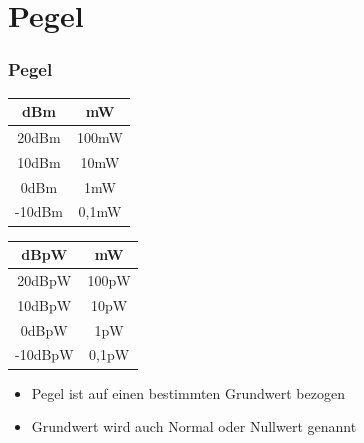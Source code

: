 \section*{Pegel}
\begin{frame}
\frametitle{Pegel}
\begin{center}
\begin{large}
\begin{minipage}{0.3\textwidth}
	\begin{tabular}{|c|c|}
		\hline
		dBm & mW \\
		\hline \hline
		20dBm  & 100mW  \\ \hline
		10dBm  & 10mW   \\ \hline
		0dBm   & 1mW    \\ \hline
		-10dBm & 0,1mW  \\ \hline
	\end{tabular}
\end{minipage}
\hspace{2cm}
\begin{minipage}{0.3\textwidth}
	\begin{tabular}{|c|c|}
		\hline
		dBpW & mW \\
		\hline \hline
		20dBpW  & 100pW  \\ \hline
		10dBpW  & 10pW   \\ \hline
		0dBpW   & 1pW    \\ \hline
		-10dBpW & 0,1pW  \\ \hline
	\end{tabular}
\end{minipage}
\vspace{0.5cm}
\end{large}
\begin{itemize}
	\item Pegel ist auf einen bestimmten Grundwert bezogen
	\item Grundwert wird auch Normal oder Nullwert genannt
\end{itemize}
\end{center}
\end{frame}


